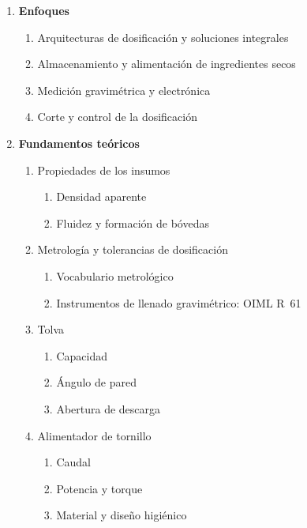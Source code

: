\begin{enumerate}[label*=\arabic*.]
\begin{enumerate}[label*=\arabic*.]
        \item \textbf{Enfoques}
        \begin{enumerate}[label*=\arabic*.]
            \item Arquitecturas de dosificación y soluciones integrales
            \item Almacenamiento y alimentación de ingredientes secos
            \item Medición gravimétrica y electrónica
            \item Corte y control de la dosificación
        \end{enumerate}

        \item \textbf{Fundamentos teóricos}
        \begin{enumerate}[label*=\arabic*.]
            \item Propiedades de los insumos
            \begin{enumerate}[label*=\arabic*.]
                \item Densidad aparente
                \item Fluidez y formación de bóvedas
            \end{enumerate}

            \item Metrología y tolerancias de dosificación
            \begin{enumerate}[label*=\arabic*.]
                \item Vocabulario metrológico
                \item Instrumentos de llenado gravimétrico: OIML R~61
            \end{enumerate}

            \item Tolva
            \begin{enumerate}[label*=\arabic*.]
                \item Capacidad
                \item Ángulo de pared
                \item Abertura de descarga
            \end{enumerate}

            \item Alimentador de tornillo
            \begin{enumerate}[label*=\arabic*.]
                \item Caudal
                \item Potencia y torque
                \item Material y diseño higiénico
            \end{enumerate}


\end{enumerate}
\end{enumerate}
\end{enumerate}
